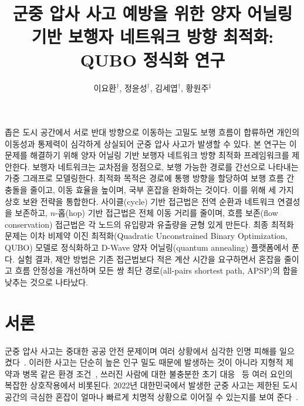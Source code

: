 \documentclass[twocolumn,a4paper]{article}
\begin{document}
\title{군중 압사 사고 예방을 위한 양자 어닐링 기반 보행자 네트워크 방향 최적화: QUBO 정식화 연구}
\author{이요환${}^\dag$, 정윤성${}^\dag$, 김세엽${}^\dag$, 황원주${}^\ddag$}
\address{\dag 부산대학교 정보컴퓨터공학부 \\
\ddag 부산대학교 정보융합공학과 \\
대한민국 부산광역시 46241 \\
Email: , , , }
\maketitle

\abstract
좁은 도시 공간에서 서로 반대 방향으로 이동하는 고밀도 보행 흐름이 합류하면 개인의 이동성과 통제력이 심각하게 상실되어 군중 압사 사고가 발생할 수 있다. 본 연구는 이 문제를 해결하기 위해 양자 어닐링 기반 보행자 네트워크 방향 최적화 프레임워크를 제안한다. 보행자 네트워크는 교차점을 정점으로, 보행 가능한 경로를 간선으로 나타내는 가중 그래프로 모델링한다. 최적화 목적은 경로에 통행 방향을 할당하여 보행 흐름 간 충돌을 줄이고, 이동 효율을 높이며, 국부 혼잡을 완화하는 것이다. 이를 위해 세 가지 상호 보완 전략을 통합한다. 사이클(cycle) 기반 접근법은 전역 순환과 네트워크 연결성을 보존하고, $n$-홉(hop) 기반 접근법은 전체 이동 거리를 줄이며, 흐름 보존(flow conservation) 접근법은 각 노드의 유입량과 유출량을 균형 있게 만든다. 최종 최적화 문제는 이차 비제약 이진 최적화(Quadratic Unconstrained Binary Optimization, QUBO) 모델로 정식화하고 D-Wave 양자 어닐링(quantum annealing) 플랫폼에서 푼다. 실험 결과, 제안 방법은 기존 접근법보다 적은 계산 시간을 요구하면서 혼잡을 줄이고 흐름 안정성을 개선하며 모든 쌍 최단 경로(all-pairs shortest path, APSP)의 합을 낮추는 것으로 나타났다.
\endabstract

\section{서론} \label{sec:intro}

군중 압사 사고는 중대한 공공 안전 문제이며 여러 상황에서 심각한 인명 피해를 일으켰다~\cite{fruin1993causes}. 이러한 사고는 단순히 높은 인구 밀도 때문에 발생하는 것이 아니라 지형적 제약과 병목 같은 환경 조건~\cite{helbing2007dynamics}, 쓰러진 사람에 대한 불충분한 초기 대응~\cite{soomaroo2012disasters} 등 여러 요인의 복잡한 상호작용에서 비롯된다. 2022년 대한민국에서 발생한 군중 사고는 제한된 도시 공간의 극심한 혼잡이 얼마나 빠르게 치명적 상황으로 이어질 수 있는지를 보여 준다~\cite{chang2024crowd}.
\end{document}

